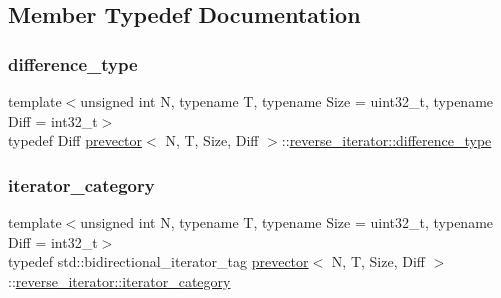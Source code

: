 \subsection{Member Typedef Documentation}
\mbox{\label{classprevector_1_1reverse__iterator_a365f89bb315bdb54cbbfafbce8b29e0a}} 
\subsubsection{\texorpdfstring{difference\+\_\+type}{difference\_type}}
{\footnotesize\ttfamily template$<$unsigned int N, typename T, typename Size = uint32\+\_\+t, typename Diff = int32\+\_\+t$>$ \\
typedef Diff \mbox{\hyperlink{classprevector}{prevector}}$<$ N, T, Size, Diff $>$\+::\mbox{\hyperlink{classprevector_1_1reverse__iterator_a365f89bb315bdb54cbbfafbce8b29e0a}{reverse\+\_\+iterator\+::difference\+\_\+type}}}

\mbox{\label{classprevector_1_1reverse__iterator_a02a9858a2c1175b18e1ab1326775b8bc}} 
\subsubsection{\texorpdfstring{iterator\+\_\+category}{iterator\_category}}
{\footnotesize\ttfamily template$<$unsigned int N, typename T, typename Size = uint32\+\_\+t, typename Diff = int32\+\_\+t$>$ \\
typedef std\+::bidirectional\+\_\+iterator\+\_\+tag \mbox{\hyperlink{classprevector}{prevector}}$<$ N, T, Size, Diff $>$\+::\mbox{\hyperlink{classprevector_1_1reverse__iterator_a02a9858a2c1175b18e1ab1326775b8bc}{reverse\+\_\+iterator\+::iterator\+\_\+category}}}

\mbox{\label{classprevector_1_1reverse__iterator_affd9dcd9ef382da1f07f4194997f5a66}} 
